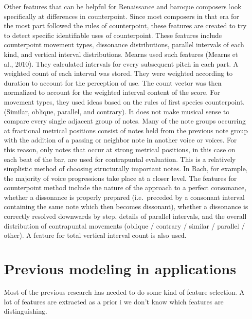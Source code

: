 \documentclass[12pt,twoside]{reedthesis}
\theoremstyle{definition}
\theoremstyle{definition}
\theoremstyle{definition}
\theoremstyle{remark}
\begin{document}
Other features that can be helpful for Renaissance and baroque composers
look specifically at differences in counterpoint. Since most composers
in that era for the most part followed the rules of counterpoint, these
features are created to try to detect specific identifiable uses of
counterpoint. These features include counterpoint movement types,
dissonance distributions, parallel intervals of each kind, and vertical
interval distributions. Mearns used such features (Mearns et al., 2010).
They calculated intervals for every subsequent pitch in each part. A
weighted count of each interval was stored. They were weighted according
to duration to account for the perception of use. The count vector was
then normalized to account for the weighted interval content of the
score. For movement types, they used ideas based on the rules of first
species counterpoint. (Similar, oblique, parallel, and contrary). It
does not make musical sense to compare every single adjacent group of
notes. Many of the note groups occurring at fractional metrical
positions consist of notes held from the previous note group with the
addition of a passing or neighbor note in another voice or voices. For
this reason, only notes that occur at strong metrical positions, in this
case on each beat of the bar, are used for contrapuntal evaluation. This
is a relatively simplistic method of choosing structurally important
notes. In Bach, for example, the majority of voice progressions take
place at a closer level. The features for counterpoint method include
the nature of the approach to a perfect consonance, whether a dissonance
is properly prepared (i.e.~preceded by a consonant interval containing
the same note which then becomes dissonant), whether a dissonance is
correctly resolved downwards by step, details of parallel intervals, and
the overall distribution of contrapuntal movements (oblique / contrary /
similar / parallel / other). A feature for total vertical interval count
is also used.

\section{Previous modeling in
applications}\label{previous-modeling-in-applications}

Most of the previous research has needed to do some kind of feature
selection. A lot of features are extracted as a prior i we don't know
which features are distinguishing.
\end{document}
